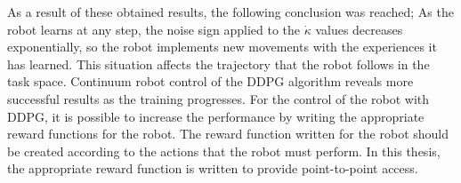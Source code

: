\documentclass[12pt,twoside,a4]{mwbk}
\begin{document}
\newpage
\noindent As a result of these obtained results, the following conclusion was reached; As the robot learns at any step, the noise sign applied to the $\dot{\kappa}$ values decreases exponentially, so the robot implements new movements with the experiences it has learned. This situation affects the trajectory that the robot follows in the task space. Continuum robot control of the DDPG algorithm reveals more successful results as the training progresses. For the control of the robot with DDPG, it is possible to increase the performance by writing the appropriate reward functions for the robot. The reward function written for the robot should be created according to the actions that the robot must perform. In this thesis, the appropriate reward function is written to provide point-to-point access.
\end{document}
